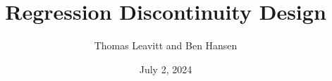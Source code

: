 \documentclass[table, xcolor = {dvipsnames}, 9pt]{beamer}
\title[]{Regression Discontinuity Design} %
\author{Thomas Leavitt and Ben Hansen} %
\institute[] %
{
\medskip
\textit{} %
}
\date{July 2, 2024} %
\theoremstyle{plain}
\begin{document}
\begin{frame}
\titlepage %
\end{frame}


\end{document}
